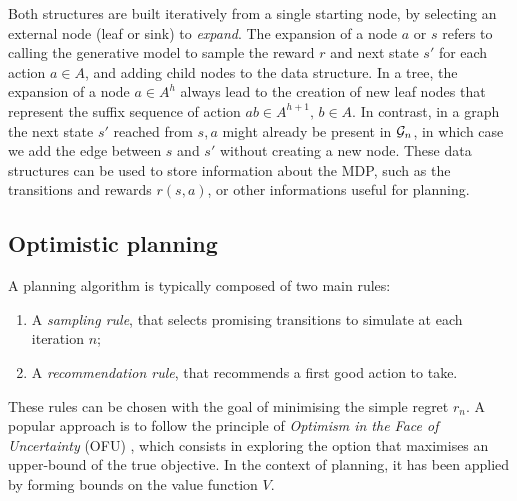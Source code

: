\documentclass[runningheads]{llncs}
\begin{document}
Both structures are built iteratively from a single starting node, by selecting an external node (leaf or sink) to \emph{expand}. The expansion of a node $a$ or $s$ refers to calling the generative model to sample the reward $r$ and next state $s'$ for each action $a\in A$, and adding child nodes to the data structure. In a tree, the expansion of a node $a\in A^h$ always lead to the creation of new leaf nodes that represent the suffix sequence of action $ab\in A^{h+1},\, b\in A$. In contrast, in a graph the next state $s'$ reached from $s,a$ might already be present in $\mathcal{G}_n$, in which case we add the edge between $s$ and $s'$ without creating a new node.
These data structures can be used to store information about the MDP, such as the transitions and rewards $r(s, a)$, or other informations useful for planning.


\subsection{Optimistic planning}

A planning algorithm is typically composed of two main rules:
\begin{enumerate}[label=(\roman*)]
	\item A \emph{sampling rule}, that selects promising transitions to simulate at each iteration $n$;
	\item A \emph{recommendation rule}, that recommends a first good action to take.
\end{enumerate}
These rules can be chosen with the goal of minimising the simple regret $r_n$.
A popular approach is to follow the principle of \emph{Optimism in the Face of Uncertainty} (OFU) \citep{Munos14}, which consists in exploring the option that maximises an upper-bound of the true objective. In the context of planning, it has been applied by forming bounds on the value function $V$.
\end{document}
